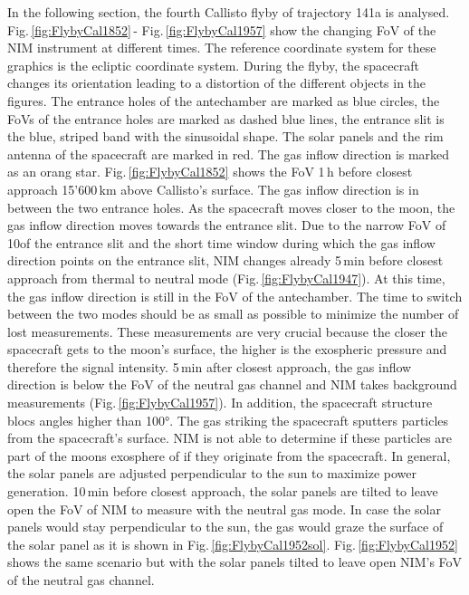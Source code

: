 	In the following section, the fourth Callisto flyby of trajectory 141a \cite{SOC_Crema3p2} is analysed. Fig.\,\ref{fig:FlybyCal1852}\,- Fig.\,\ref{fig:FlybyCal1957} show the changing FoV of the NIM instrument at different times. The reference coordinate system for these graphics is the ecliptic coordinate system. During the flyby, the spacecraft changes its orientation leading to a distortion of the different objects in the figures. The entrance holes of the antechamber are marked as blue circles, the FoVs of the entrance holes are marked as dashed blue lines, the entrance slit is the blue, striped band with the sinusoidal shape. The solar panels and the rim antenna of the spacecraft are marked in red. The gas inflow direction is marked as an orang star. Fig.\,\ref{fig:FlybyCal1852} shows the FoV 1\,h before closest approach 15'600\,km above Callisto's surface. The gas inflow direction is in between the two entrance holes. As the spacecraft moves closer to the moon, the gas inflow direction moves towards the entrance slit. Due to the narrow FoV of 10\degree of the entrance slit and the short time window during which the gas inflow direction points on the entrance slit, NIM changes already 5\,min before closest approach from thermal to neutral mode (Fig.\,\ref{fig:FlybyCal1947}). At this time, the gas inflow direction is still in the FoV of the antechamber. The time to switch between the two modes should be as small as possible to minimize the number of lost measurements. These measurements are very crucial because the closer the spacecraft gets to the moon's surface, the higher is the exospheric pressure and therefore the signal intensity. 5\,min after closest approach, the gas inflow direction is below the FoV of the neutral gas channel and NIM takes background measurements (Fig.\,\ref{fig:FlybyCal1957}). In addition, the spacecraft structure blocs angles higher than 100\si{\degree}. The gas striking the spacecraft sputters particles from the spacecraft's surface. NIM is not able to determine if these particles are part of the moons exosphere of if they originate from the spacecraft. In general, the solar panels are adjusted perpendicular to the sun to maximize power generation. 10\,min before closest approach, the solar panels are tilted to leave open the FoV of NIM to measure with the neutral gas mode. In case the solar panels would stay perpendicular to the sun, the gas would graze the surface of the solar panel as it is shown in Fig.\,\ref{fig:FlybyCal1952sol}. Fig.\,\ref{fig:FlybyCal1952} shows the same scenario but with the solar panels tilted to leave open NIM's FoV of the neutral gas channel.\\
